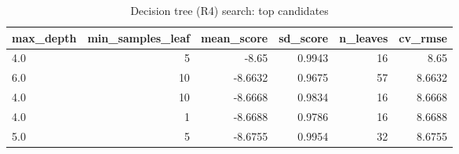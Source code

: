 \begin{table}[htbp]
\centering
\small
\caption{Decision tree (R4) search: top candidates}
\begin{tabular}{lrrrrr}
\toprule
max\_depth & min\_samples\_leaf & mean\_score & sd\_score & n\_leaves & cv\_rmse \\
\midrule
4.0 & 5 & -8.65 & 0.9943 & 16 & 8.65 \\
6.0 & 10 & -8.6632 & 0.9675 & 57 & 8.6632 \\
4.0 & 10 & -8.6668 & 0.9834 & 16 & 8.6668 \\
4.0 & 1 & -8.6688 & 0.9786 & 16 & 8.6688 \\
5.0 & 5 & -8.6755 & 0.9954 & 32 & 8.6755 \\
\bottomrule
\end{tabular}
\par\smallskip\begin{minipage}{\linewidth}\footnotesize \end{minipage}
\end{table}


